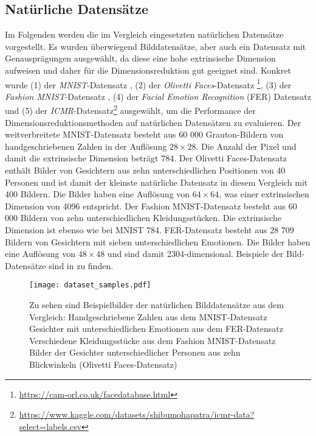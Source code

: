 \subsection{Natürliche Datensätze}
\label{ch:Vergleich:sec:VerwendeteDatensaetze:natuerlich}
Im Folgenden werden die im Vergleich eingesetzten natürlichen Datensätze vorgestellt. Es wurden überwiegend Bilddatensätze, aber auch ein Datensatz mit Genausprägungen ausgewählt, da diese eine
hohe extrinsische Dimension aufweisen und daher für die Dimensionsreduktion gut geeignet sind.
Konkret wurde (1) der \textit{MNIST}-Datensatz \parencite{LeCun.2010}, (2) der \textit{Olivetti Faces}-Datensatz
\footnote{\url{https://cam-orl.co.uk/facedatabase.html}}, (3) der \textit{Fashion MNIST}-Datensatz \parencite{Xiao.2017}, (4) der \textit{Facial Emotion Recognition} (FER) Datensatz \parencite{DumitruIanGoodfellowWillCukierskiYoshuaBengio.2013} und (5) der
\textit{ICMR}-Datensatz\footnote{\url{https://www.kaggle.com/datasets/shibumohapatra/icmr-data?select=labels.csv}}
ausgewählt, um die Performance der Dimensionsreduktionsmethoden auf natürlichen Datensätzen zu
evaluieren. Der weitverbreitete MNIST-Datensatz besteht aus 60 000 Grauton-Bildern von
handgeschriebenen Zahlen in der Auflösung $28 \times 28$. Die Anzahl der Pixel und damit die
extrinsische Dimension beträgt 784. Der Olivetti Faces-Datensatz enthält Bilder von Gesichtern aus
zehn unterschiedlichen Positionen von 40 Personen und ist damit der kleinste natürliche Datensatz
in diesem Vergleich mit 400 Bildern. Die Bilder haben eine Auflösung von $64 \times 64$, was einer
extrinsischen Dimension von 4096 entspricht. Der Fashion MNIST-Datensatz besteht aus 60 000 Bildern
von zehn unterschiedlichen Kleidungsstücken. Die extrinsische Dimension ist ebenso wie bei MNIST
784. FER-Datensatz besteht aus 28 709 Bildern von Gesichtern mit sieben unterschiedlichen
Emotionen. Die Bilder haben eine Auflösung von $48 \times 48$ und sind damit 2304-dimensional.
Beispiele der Bild-Datensätze sind in  zu finden.
\begin{figure}
	\begin{center}
		\texttt{[image: dataset\_samples.pdf]}
	\end{center}
	\caption[Beispielbilder der natürlichen Datensätze]{Zu sehen sind Beispielbilder der natürlichen Bilddatensätze aus dem Vergleich: \captiona Handgeschriebene Zahlen aus dem MNIST-Datensatz \captionb Gesichter mit unterschiedlichen Emotionen aus dem FER-Datensatz \captionc Verschiedene Kleidungsstücke aus dem Fashion MNIST-Datensatz \captiond Bilder der Gesichter unterschiedlicher Personen aus zehn Blickwinkeln (Olivetti Faces-Datensatz)}
	\label{fig:Dataset_samples}
\end{figure}

